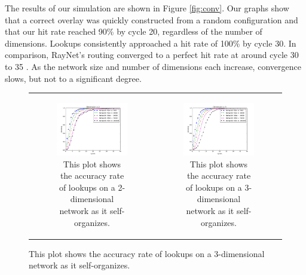 The results of our simulation are shown in Figure \ref{fig:conv}.
Our graphs show that a correct overlay was quickly constructed from a random configuration and that our hit rate reached 90\% by cycle 20, regardless of the number of dimensions.
Lookups consistently approached a hit rate of 100\% by cycle 30.
In comparison, RayNet's routing converged to a perfect hit rate at around cycle 30 to 35 \cite{raynet}.
As the network size and number of dimensions each increase, convergence slows, but not to a significant degree.

\begin{figure}
	\centering
	\begin{tabular}{cc}

		\begin{subfigure}{0.5\columnwidth}
			\includegraphics[width=\linewidth]{figs/conv_d2}
			\caption{This plot shows the accuracy rate of lookups on a 2-dimensional network as it self-organizes.}
			\label{fig:conv2}
		\end{subfigure} &

		\begin{subfigure}{0.5\columnwidth}
			\includegraphics[width=\linewidth]{figs/conv_d3}
			\caption{This plot shows the accuracy rate of lookups on a 3-dimensional network as it self-organizes.}
			\label{fig:conv3}
		\end{subfigure} \\


\end{tabular}
\end{figure}

